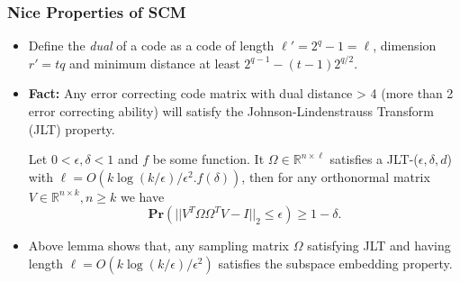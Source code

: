\documentclass[9pt]{beamer}
\newcommand{\mB}{\mathbb}
\begin{document}
\begin{frame}
\frametitle{Nice Properties of SCM} 
\begin{itemize} 
\item Define the \textit{dual} of a code as a code of length $\ell' = 2^q - 1 = \ell$, dimension $r' = tq$ and minimum distance at least $2^{q-1} - (t - 1)2^{q/2}$.
\vspace{3mm}

\item \textbf{Fact:} Any error correcting code matrix with dual distance > 4 (more than 2 error correcting ability) will satisfy the Johnson-Lindenstrauss Transform (JLT) property.
\vspace{3mm}

\begin{lemma}
Let $0< \epsilon, \delta < 1$ and $f$ be some function. It $\Omega \in \mB{R}^{n \times \ell}$ satisfies a JLT-($\epsilon, \delta, d$) with $\ell = O(k \log(k /\epsilon)/\epsilon^2. f(\delta))$, then for any orthonormal matrix $V \in \mB{R}^{n \times k}, n \ge k$ we have 
\[ \textbf{Pr}(|| V^T \Omega \Omega^TV - I||_2 \le \epsilon) \ge 1 - \delta. \]
\end{lemma}

\vspace{3mm}
\item Above lemma shows that, any sampling matrix $\Omega$ satisfying JLT and having length $\ell = O(k \log(k/\epsilon) / \epsilon^2)$ satisfies the subspace embedding property.
\end{itemize}
\end{frame}
\end{document}
